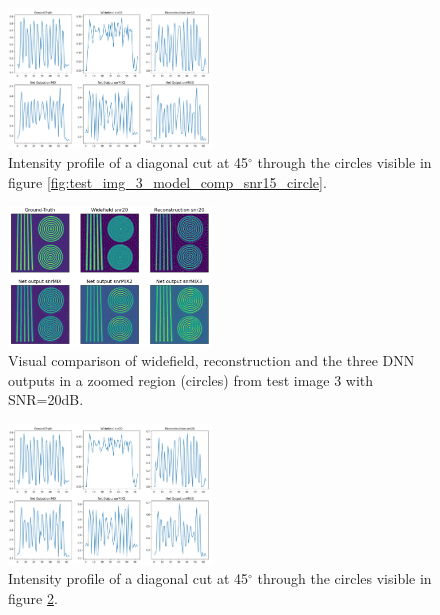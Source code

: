 \documentclass[conference]{IEEEtran}
\begin{document}
\begin{figure}[h!]
    \centering
    \includegraphics[width=0.48\textwidth]{images/test_img_3_model_comp_snr15_circle_cut.png}
    \caption{Intensity profile of a diagonal cut at 45$^\circ$ through the circles visible in figure \ref{fig:test_img_3_model_comp_snr15_circle}.}
    \label{fig:test_img_3_model_comp_snr15_circle_cut}
\end{figure}
\begin{figure}[h!]
    \centering
    \includegraphics[width=0.48\textwidth]{images/test_img_3_model_comp_snr20_circle.png}
    \caption{Visual comparison of widefield, reconstruction and the three DNN outputs in a zoomed region (circles) from test image 3 with SNR=20dB.}
    \label{fig:test_img_3_model_comp_snr20_circle}
\end{figure}
\begin{figure}[h!]
    \centering
    \includegraphics[width=0.48\textwidth]{images/test_img_3_model_comp_snr20_circle_cut.png}
    \caption{Intensity profile of a diagonal cut at 45$^\circ$ through the circles visible in figure \ref{fig:test_img_3_model_comp_snr20_circle}.}
    \label{fig:test_img_3_model_comp_snr20_circle_cut}
\end{figure}
\end{document}
